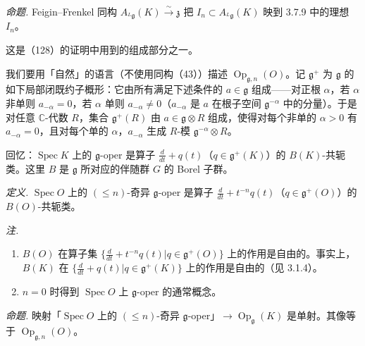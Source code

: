  \emph{命题.} Feigin--Frenkel 同构 $A_{{}^{L}\mathfrak{g}}(K)\xrightarrow{\sim}\mathfrak{z}$ 把 $I_{n}\subset A_{{}^{L}\mathfrak{g}}(K)$ 映到 3.7.9 中的理想 $I_{n}$。

这是（128）的证明中用到的组成部分之一。

 我们要用「自然」的语言（不使用同构（43））描述 $\operatorname{Op}_{\mathfrak{g},n}(O)$。记 $\mathfrak{g}^{+}$ 为 $\mathfrak{g}$ 的如下局部闭既约子概形：它由所有满足下述条件的 $a\in\mathfrak{g}$ 组成——对正根 $\alpha$，若 $\alpha$ 非单则 $a_{-\alpha}=0$，若 $\alpha$ 单则 $a_{-\alpha}\ne 0$（$a_{-\alpha}$ 是 $a$ 在根子空间 $\mathfrak{g}^{-\alpha}$ 中的分量）。于是对任意 $\mathbb{C}$-代数 $R$，集合 $\mathfrak{g}^{+}(R)$ 由 $a\in\mathfrak{g}\otimes R$ 组成，使得对每个非单的 $\alpha>0$ 有 $a_{-\alpha}=0$，且对每个单的 $\alpha$，$a_{-\alpha}$ 生成 $R$-模 $\mathfrak{g}^{-\alpha}\otimes R$。

回忆：$\operatorname{Spec}K$ 上的 $\mathfrak{g}$-oper 是算子 $\frac{d}{dt}+q(t)$（$q\in\mathfrak{g}^{+}(K)$）的 $B(K)$-共轭类。这里 $B$ 是 $\mathfrak{g}$ 所对应的伴随群 $G$ 的 Borel 子群。


 \emph{定义.} $\operatorname{Spec}O$ 上的 $(\le n)$-奇异 $\mathfrak{g}$-oper 是算子 $\frac{d}{dt}+t^{-n}q(t)$（$q\in\mathfrak{g}^{+}(O)$）的 $B(O)$-共轭类。

\emph{注.}
\begin{enumerate}[label=(\roman*),leftmargin=2.2em]
\item $B(O)$ 在算子集 $\{\frac{d}{dt}+t^{-n}q(t)|q\in\mathfrak{g}^{+}(O)\}$ 上的作用是自由的。事实上，$B(K)$ 在 $\{\frac{d}{dt}+q(t)|q\in\mathfrak{g}^{+}(K)\}$ 上的作用是自由的（见 3.1.4）。
\item $n=0$ 时得到 $\operatorname{Spec}O$ 上 $\mathfrak{g}$-oper 的通常概念。
\end{enumerate}

 \emph{命题.} 映射「$\operatorname{Spec}O$ 上的 $(\le n)$-奇异 $\mathfrak{g}$-oper」$\to\operatorname{Op}_{\mathfrak{g}}(K)$ 是单射。其像等于 $\operatorname{Op}_{\mathfrak{g},n}(O)$。

